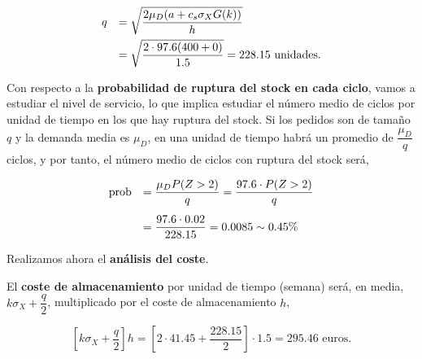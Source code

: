 \documentclass[a4paper,12pt]{article}
\begin{document}
\begin{equation*}
\begin{array}{l l}
q & =  \sqrt{\dfrac{2\mu_D (a + c_s \sigma_X G(k))}{h}} \\[.3cm]
\, & = \sqrt{\dfrac{2\cdot 97.6(400 + 0)}{1.5}} = 228.15\text{ unidades.}
\end{array}
\end{equation*}

Con respecto a la \textbf{probabilidad de ruptura del stock en cada ciclo}, vamos a estudiar el nivel de servicio, lo que implica estudiar el n\'umero medio de ciclos por unidad de tiempo en los que hay ruptura del stock. Si los pedidos son de tama\~no $q$ y la demanda media es $\mu_D$, en una unidad de tiempo habr\'a un promedio de $\dfrac{\mu_D}{q}$ ciclos, y por tanto, el n\'umero medio de ciclos con ruptura del stock ser\'a,

\begin{equation*}
\begin{array}{l l}
\text{prob} & = \dfrac{\mu_D P(Z > 2)}{q} = \dfrac{97.6\cdot P(Z > 2)}{q}\\[.5cm]
\, & = \dfrac{97.6\cdot 0.02}{228.15} = 0.0085 \sim 0.45\%
\end{array}
\end{equation*}

\smallskip

Realizamos ahora el \textbf{an\'alisis del coste}. 



El \textbf{coste de almacenamiento} por unidad de tiempo (semana) ser\'a, en media, $k\sigma_X + \dfrac{q}{2}$, multiplicado por el coste de almacenamiento $h$,

$$ \left[k\sigma_X + \dfrac{q}{2}\right] h = \left[2\cdot 41.45 + \dfrac{228.15}{2} \right]\cdot 1.5 = 295.46\text{ euros.}$$
\end{document}
